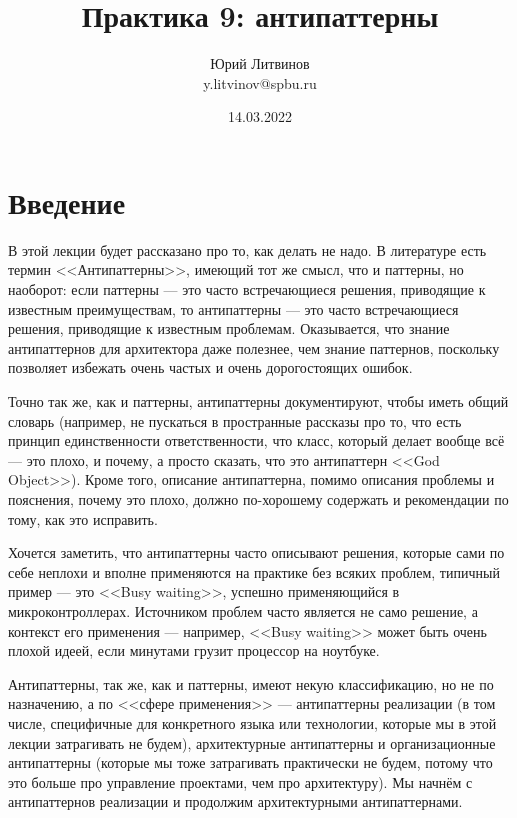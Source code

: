 \documentclass[a5paper]{article}
\title{Практика 9: антипаттерны}
\author{Юрий Литвинов\\\small{y.litvinov@spbu.ru}}
\date{14.03.2022}
\begin{document}
\maketitle
\thispagestyle{empty}

\section{Введение}

В этой лекции будет рассказано про то, как делать не надо. В литературе есть термин <<Антипаттерны>>, имеющий тот же смысл, что и паттерны, но наоборот: если паттерны --- это часто встречающиеся решения, приводящие к известным преимуществам, то антипаттерны --- это часто встречающиеся решения, приводящие к известным проблемам. Оказывается, что знание антипаттернов для архитектора даже полезнее, чем знание паттернов, поскольку позволяет избежать очень частых и очень дорогостоящих ошибок.

Точно так же, как и паттерны, антипаттерны документируют, чтобы иметь общий словарь (например, не пускаться в пространные рассказы про то, что есть принцип единственности ответственности, что класс, который делает вообще всё --- это плохо, и почему, а просто сказать, что это антипаттерн <<God Object>>). Кроме того, описание антипаттерна, помимо описания проблемы и пояснения, почему это плохо, должно по-хорошему содержать и рекомендации по тому, как это исправить. 

Хочется заметить, что антипаттерны часто описывают решения, которые сами по себе неплохи и вполне применяются на практике без всяких проблем, типичный пример --- это <<Busy waiting>>, успешно применяющийся в микроконтроллерах. Источником проблем часто является не само решение, а контекст его применения --- например, <<Busy waiting>> может быть очень плохой идеей, если минутами грузит процессор на ноутбуке.

Антипаттерны, так же, как и паттерны, имеют некую классификацию, но не по назначению, а по <<сфере применения>> --- антипаттерны реализации (в том числе, специфичные для конкретного языка или технологии, которые мы в этой лекции затрагивать не будем), архитектурные антипаттерны и организационные антипаттерны (которые мы тоже затрагивать практически не будем, потому что это больше про управление проектами, чем про архитектуру). Мы начнём с антипаттернов реализации и продолжим архитектурными антипаттернами.
\end{document}
